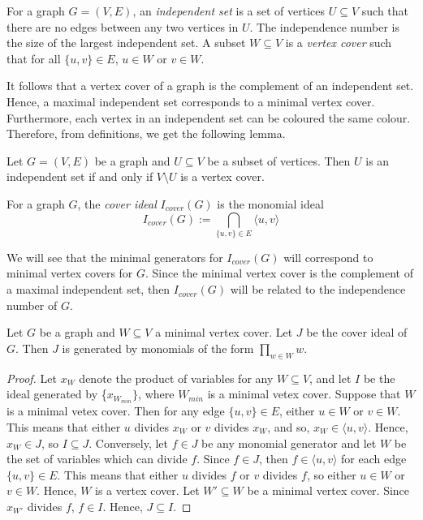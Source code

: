 \documentclass[../main.tex]{subfiles}
\begin{document}
    \begin{definition}
        For a graph $G=(V,E)$, an \emph{independent set} is a set of vertices $U\subseteq V$ such that there are no edges between any two vertices in $U$. The independence number is the size of the largest independent set. A subset $W\subseteq V$ is a \emph{vertex cover} such that for all $\{u,v\}\in E$, $u\in W$ or $v\in W$. 
    \end{definition}

    It follows that a vertex cover of a graph is the complement of an independent set. Hence, a maximal independent set corresponds to a minimal vertex cover. Furthermore, each vertex in an independent set can be coloured the same colour. Therefore, from definitions, we get the following lemma.

    \begin{lemma} \label{lem:independent vertex cover}
        Let $G=(V,E)$ be a graph and $U\subseteq V$ be a subset of vertices. Then $U$ is an independent set if and only if $V\setminus U$ is a vertex cover.
    \end{lemma}

    \begin{definition}
        For a graph $G$, the \emph{cover ideal} $I_{cover}(G)$ is the monomial ideal
        $$I_{cover}(G) := \bigcap_{\{u,v\}\in E}\langle u,v\rangle$$
    \end{definition}
    We will see that the minimal generators for $I_{cover}(G)$ will correspond to minimal vertex covers for $G$. Since the minimal vertex cover is the complement of a maximal independent set, then $I_{cover}(G)$ will be related to the independence number of $G$.

    \begin{proposition} \label{prop:minimal vertex cover}
        Let $G$ be a graph and $W\subseteq V$ a minimal vertex cover. Let $J$ be the cover ideal of $G$. Then $J$ is generated by monomials of the form $\prod_{w\in W} w$.
    \end{proposition}
    \begin{proof}
        Let $x_W$ denote the product of variables for any $W\subseteq V$, and let $I$ be the ideal generated by \{$x_{W_{min}}\}$, where $W_{min}$ is a minimal vetex cover. Suppose that $W$ is a minimal vetex cover. Then for any edge $\{u,v\}\in E$, either $u\in W$ or $v\in W$. This means that either $u$ divides $x_W$ or $v$ divides $x_W$, and so, $x_W\in \langle u,v\rangle$. Hence, $x_W\in J$, so $I\subseteq J$. Conversely, let $f\in J$ be any monomial generator and let $W$ be the set of variables which can divide $f$. Since $f\in J$, then $f\in \langle u,v\rangle$ for each edge $\{u,v\}\in E$. This means that either $u$ divides $f$ or $v$ divides $f$, so either $u\in W$ or $v\in W$. Hence, $W$ is a vertex cover. Let $W'\subseteq W$ be a minimal vertex cover. Since $x_{W'}$ divides $f$, $f\in I$. Hence, $J\subseteq I$.
    \end{proof}
\end{document}
